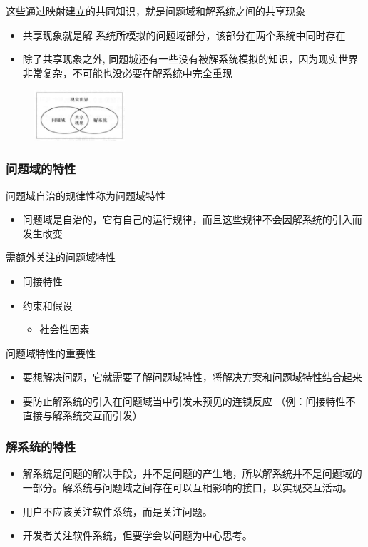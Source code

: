 这些通过映射建立的共同知识，就是问题域和解系统之间的共享现象
\begin{itemize}
    \item 共享现象就是解 系统所模拟的问题域部分，该部分在两个系统中同时存在
    \item 除了共享现象之外, 同题城还有一些没有被解系统模拟的知识，因为现实世界非常复杂，不可能也没必要在解系统中完全重现 
\end{itemize}
\begin{figure}[H]
	\centering
	\includegraphics[width=0.3\textwidth]{img/问题域和解系统的关系.png}
\end{figure}

\subsubsection{问题域的特性}
问题域自治的规律性称为问题域特性
\begin{itemize}
    \item 问题域是自治的，它有自己的运行规律，而且这些规律不会因解系统的引入而发生改变
\end{itemize}

需额外关注的问题域特性
\begin{itemize}
    \item 间接特性
    \item 约束和假设 
    \begin{itemize}
        \item 社会性因素
    \end{itemize}
\end{itemize}

问题域特性的重要性
\begin{itemize}
    \item 要想解决问题，它就需要了解问题域特性，将解决方案和问题域特性结合起来 
    \item 要防止解系统的引入在问题域当中引发未预见的连锁反应 （例：间接特性不直接与解系统交互而引发）
\end{itemize}

\subsubsection{解系统的特性}
\begin{itemize}
    \item 解系统是问题的解决手段，并不是问题的产生地，所以解系统并不是问题域的一部分。解系统与问题域之间存在可以互相影响的接口，以实现交互活动。
    \item 用户不应该关注软件系统，而是关注问题。
    \item 开发者关注软件系统，但要学会以问题为中心思考。
\end{itemize}


